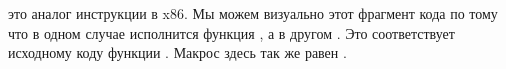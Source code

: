  это аналог инструкции \TEST в x86.
Мы можем  визуально этот фрагмент кода по тому что в одном случае исполнится 
функция , а в другом .
Это соответствует исходному коду функции .
Макрос  здесь так же равен .

